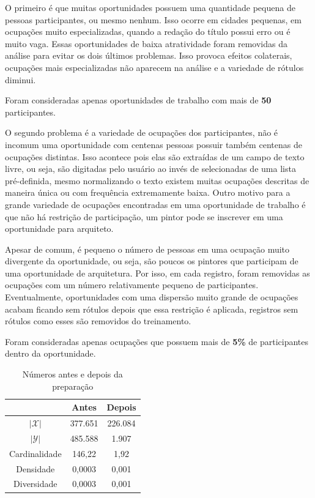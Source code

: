 \documentclass[runningheads,a4paper]{llncs}
\begin{document}
O primeiro é que muitas oportunidades possuem uma quantidade pequena de pessoas participantes, ou mesmo nenhum. Isso ocorre em cidades pequenas, em ocupações muito especializadas, quando a redação do título possui erro ou é muito vaga. Essas oportunidades de baixa atratividade foram removidas da análise para evitar os dois últimos problemas. Isso provoca efeitos colaterais, ocupações mais especializadas não aparecem na análise e a variedade de rótulos diminui.

Foram consideradas apenas oportunidades de trabalho com mais de \textbf{50} participantes.

O segundo problema é a variedade de ocupações dos participantes, não é incomum uma oportunidade com centenas pessoas possuir também centenas de ocupações distintas. Isso acontece pois elas são extraídas de um campo de texto livre, ou seja, são digitadas pelo usuário ao invés de selecionadas de uma lista pré-definida, mesmo normalizando o texto existem muitas ocupações descritas de maneira única ou com frequência extremamente baixa. Outro motivo para a grande variedade de ocupações encontradas em uma oportunidade de trabalho é que não há restrição de participação, um pintor pode se inscrever em uma oportunidade para arquiteto.

Apesar de comum, é pequeno o número de pessoas em uma ocupação muito divergente da oportunidade, ou seja, são poucos os pintores que participam de uma oportunidade de arquitetura. Por isso, em cada registro, foram removidas as ocupações com um número relativamente pequeno de participantes. Eventualmente, oportunidades com uma dispersão muito grande de ocupações acabam ficando sem rótulos depois que essa restrição é aplicada, registros sem rótulos como esses são removidos do treinamento.

Foram consideradas apenas ocupações que possuem mais de \textbf{5\%} de participantes dentro da oportunidade.

\begin{table}
	\centering
	\begin{tabular}{| c | c | c |}
		\hline
		& \textbf{Antes} & \textbf{Depois} \\
		\hline
		$|\mathcal{X}|$ & 377.651 & 226.084 \\
		\hline
		$|\mathcal{Y}|$ & 485.588 & 1.907 \\
		\hline
		Cardinalidade & 146,22 & 1,92 \\
		\hline
		Densidade & 0,0003 & 0,001 \\
		\hline
		Diversidade & 0,0003 & 0,001 \\
		\hline
	\end{tabular}
	\caption{Números antes e depois da preparação}
	\label{tab:preparacao}
\end{table}
\end{document}
